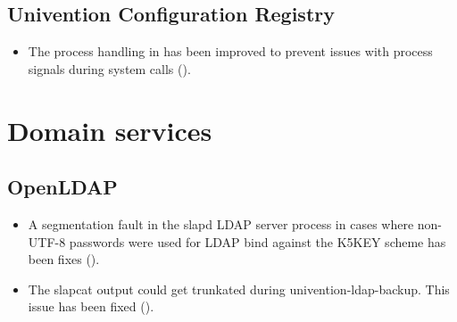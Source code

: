 \subsection{Univention Configuration Registry}
\begin{itemize}
\item The process handling in  has been improved to prevent issues with process
  signals during system calls ().
\end{itemize}






\section{Domain services}

\subsection{OpenLDAP}
\begin{itemize}
\item A segmentation fault in the slapd LDAP server process in cases where
non-UTF-8 passwords were used for LDAP bind against the {K5KEY} scheme has
been fixes ().

\item The slapcat output could get trunkated during univention-ldap-backup.
This issue has been fixed ().

\end{itemize}

